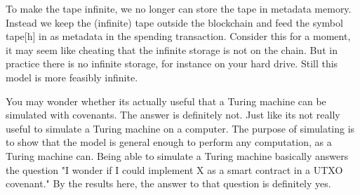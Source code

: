 To make the tape infinite, we no longer can store the tape in metadata memory. Instead we keep the (infinite) tape outside the blockchain and feed the symbol tape[h] in as metadata in the spending transaction. Consider this for a moment, it may seem like cheating that the infinite storage is not on the chain. But in practice there is no infinite storage, for instance on your hard drive. Still this model is more feasibly infinite.



You may wonder whether its actually useful that a Turing machine can be simulated with covenants. The answer is definitely not. Just like its not really useful to simulate a Turing machine on a computer. The purpose of simulating is to show that the model is general enough to perform any computation, as a Turing machine can. Being able to simulate a Turing machine basically answers the question "I wonder if I could implement X as a smart contract in a UTXO covenant." By the results here, the answer to that question is definitely yes.
